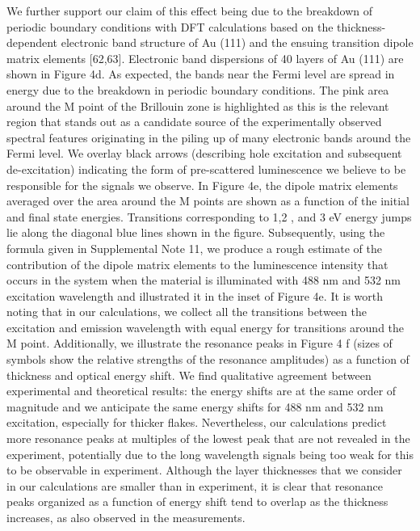 \documentclass[10pt]{article}
\begin{document}
We further support our claim of this effect being due to the breakdown of periodic boundary conditions with DFT calculations based on the thickness-dependent electronic band structure of Au (111) and the ensuing transition dipole matrix elements [62,63]. Electronic band dispersions of 40 layers of Au (111) are shown in Figure 4d. As expected, the bands near the Fermi level are spread in energy due to the breakdown in periodic boundary conditions. The pink area around the M point of the Brillouin zone is highlighted as this is the relevant region that stands out as a candidate source of the experimentally observed spectral features originating in the piling up of many electronic bands around the Fermi level. We overlay black arrows (describing hole excitation and subsequent de-excitation) indicating the form of pre-scattered luminescence we believe to be responsible for the signals we observe. In Figure 4e, the dipole matrix elements averaged over the area around the M points are shown as a function of the initial and final state energies. Transitions corresponding to 1,2 , and 3 eV energy jumps lie along the diagonal blue lines shown in the figure. Subsequently, using the formula given in Supplemental Note 11, we produce a rough estimate of the contribution of the dipole matrix elements to the luminescence intensity that occurs in the system when the material is illuminated with 488 nm and 532 nm excitation wavelength and illustrated it in the inset of Figure 4e. It is worth noting that in our calculations, we collect all the transitions between the excitation and emission wavelength with equal energy for transitions around the M point. Additionally, we illustrate the resonance peaks in Figure 4 f (sizes of\\
symbols show the relative strengths of the resonance amplitudes) as a function of thickness and optical energy shift. We find qualitative agreement between experimental and theoretical results: the energy shifts are at the same order of magnitude and we anticipate the same energy shifts for 488 nm and 532 nm excitation, especially for thicker flakes. Nevertheless, our calculations predict more resonance peaks at multiples of the lowest peak that are not revealed in the experiment, potentially due to the long wavelength signals being too weak for this to be observable in experiment. Although the layer thicknesses that we consider in our calculations are smaller than in experiment, it is clear that resonance peaks organized as a function of energy shift tend to overlap as the thickness increases, as also observed in the measurements.
\end{document}

